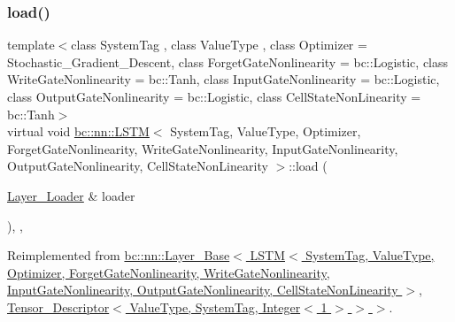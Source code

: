 \subsubsection{\texorpdfstring{load()}{load()}}
{\footnotesize\ttfamily template$<$class System\+Tag , class Value\+Type , class Optimizer  = Stochastic\+\_\+\+Gradient\+\_\+\+Descent, class Forget\+Gate\+Nonlinearity  = bc\+::\+Logistic, class Write\+Gate\+Nonlinearity  = bc\+::\+Tanh, class Input\+Gate\+Nonlinearity  = bc\+::\+Logistic, class Output\+Gate\+Nonlinearity  = bc\+::\+Logistic, class Cell\+State\+Non\+Linearity  = bc\+::\+Tanh$>$ \\
virtual void \hyperlink{structbc_1_1nn_1_1LSTM}{bc\+::nn\+::\+L\+S\+TM}$<$ System\+Tag, Value\+Type, Optimizer, Forget\+Gate\+Nonlinearity, Write\+Gate\+Nonlinearity, Input\+Gate\+Nonlinearity, Output\+Gate\+Nonlinearity, Cell\+State\+Non\+Linearity $>$\+::load (\begin{DoxyParamCaption}\item[{\hyperlink{structbc_1_1nn_1_1Layer__Loader}{Layer\+\_\+\+Loader} \&}]{loader }\end{DoxyParamCaption})\hspace{0.3cm}{\ttfamily [inline]}, {\ttfamily [override]}, {\ttfamily [virtual]}}



Reimplemented from \hyperlink{structbc_1_1nn_1_1Layer__Base_a5b3a9854215815f810bef4922b74efaf}{bc\+::nn\+::\+Layer\+\_\+\+Base$<$ L\+S\+T\+M$<$ System\+Tag, Value\+Type, Optimizer, Forget\+Gate\+Nonlinearity, Write\+Gate\+Nonlinearity, Input\+Gate\+Nonlinearity, Output\+Gate\+Nonlinearity, Cell\+State\+Non\+Linearity $>$, Tensor\+\_\+\+Descriptor$<$ Value\+Type, System\+Tag, Integer$<$ 1 $>$ $>$ $>$}.

\mbox{\label{structbc_1_1nn_1_1LSTM_a145581143a450d11a870b3c59cc1d47f}} 
